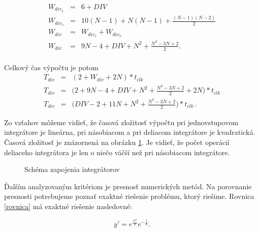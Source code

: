 \begin{eqnarray}
W_{div_1} & = & 6 + DIV \nonumber \\ 
W_{div_x} & = & 10(N-1) + N(N-1) + \frac{(N-1)(N-2)}{2} \nonumber \\ 
W_{div} & = & W_{div_1} + W_{div_x} \nonumber \\ 
W_{div} & = & 9N - 4 + DIV + N^2 + \frac{N^2-3N+2}{2} . \nonumber \\ 
\end{eqnarray}

Celkový čas výpočtu je potom 
\begin{eqnarray}
T_{div} & = & (2 + W_{div} + 2N)*t_{clk} \nonumber \\ 
T_{div} & = & \bigg(2 + 9N - 4 + DIV + N^2 + \frac{N^2-3N+2}{2} + 2N\bigg)*t_{clk} \nonumber \\
T_{div} & = & \bigg(DIV - 2 + 11N + N^2 + \frac{N^2-3N+2}{2}\bigg)*t_{clk} \, .
\end{eqnarray}

Zo vzťahov môžeme vidieť, že časová zložitosť výpočtu pri jednovstupovom integrátore je lineárna, pri násobiacom a pri deliacom integrátore je kvadratická. Časová zložitosť je znázornená na obrázku \ref{graf}. Je vidieť, že počet operácií deliaceho integrátora je len o niečo väčší než pri násobiacom integrátore. 

\begin{figure}[H]
\centering
{}
\caption{Schéma zapojenia integrátorov}
\label{graf}
\end{figure}


\newpage
Ďalším analyzovaným kritériom je presnosť numerických metód. Na porovnanie presnosti potrebujeme poznať exaktné riešenie problému, ktorý riešime. Rovnica \eqref{rovnica} má exaktné riešenie nasledovné:

\begin{equation}
y' = e^{\frac{e^{at}}{a}} e^{-\frac{1}{a}} .
\end{equation}
\bigskip


